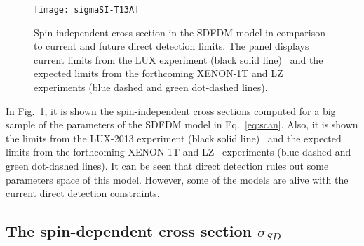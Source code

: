 \begin{figure}[h]
\begin{center}
\texttt{[image: sigmaSI-T13A]}  
\caption{Spin-independent cross section in the SDFDM model in comparison to current and future direct detection limits. 
The panel displays current limits from the LUX experiment (black solid line)~\cite{2013arXiv1310.8214L} and the expected limits from the forthcoming XENON-1T and LZ~\cite{Cushman:2013zza} experiments (blue dashed and green dot-dashed lines).
}
\label{fig:sigma-SI}
\end{center}
\end{figure}

In Fig.~\ref{fig:sigma-SI}, it is shown the spin-independent cross sections computed for a big sample of the parameters of the SDFDM model in Eq.~\eqref{eq:scan}. 
Also, it is shown the limits from the LUX-2013 experiment (black solid line)~\cite{2013arXiv1310.8214L} and the expected limits from the forthcoming XENON-1T and LZ~\cite{Cushman:2013zza} experiments (blue dashed and green dot-dashed lines).  
It can be seen that direct detection rules out some parameters space of this model. However, some of the models are alive with the current direct detection constraints.     








\subsection{The spin-dependent cross section $\sigma_{SD}$}

